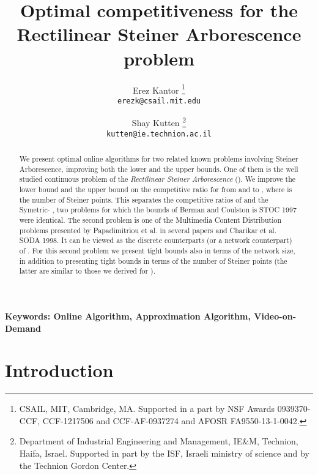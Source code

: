 \documentclass[11pt]{article}
\begin{document}
\title{
Optimal competitiveness for the Rectilinear Steiner Arborescence problem
}

\author{
Erez Kantor
\thanks{CSAIL, MIT, Cambridge, MA.
Supported in a part by NSF Awards 0939370-CCF, CCF-1217506 and  CCF-AF-0937274 and AFOSR FA9550-13-1-0042.
}\\
{\small\tt erezk@csail.mit.edu}
\and
Shay Kutten
\thanks{Department of
Industrial Engineering and Management,
IE\&M, Technion,
Haifa, Israel.  Supported in part by the
ISF,
Israeli ministry of science
and by the Technion Gordon Center.
} \\
{\small\tt kutten@ie.technion.ac.il}
}






\date{}

\maketitle

\begin{abstract}
We present optimal online algorithms for two related known problems involving Steiner Arborescence, improving both the lower and the upper bounds.
One of them is the well studied continuous problem of the {\em Rectilinear Steiner Arborescence} ().
We improve the lower bound and the upper bound on the competitive ratio for  from  and  to ,
where  is the number of Steiner points.
This separates the competitive ratios of  and the Symetric- , two problems for which the bounds of Berman and Coulston is STOC 1997 were identical.
The second problem is one of the Multimedia Content Distribution problems presented by Papadimitriou et al. in several papers and Charikar  et al. SODA 1998.
It can be viewed as the discrete counterparts (or a network counterpart) of .
For this second problem we present tight bounds also in terms of the network size,
in addition to presenting tight bounds in terms of the number of Steiner points (the latter are similar to those we derived for ).
\end{abstract}

\paragraph*{\bf Keywords: Online Algorithm, Approximation Algorithm, Video-on-Demand}




\section{Introduction}
\label{sec: Introduction}
\end{document}
